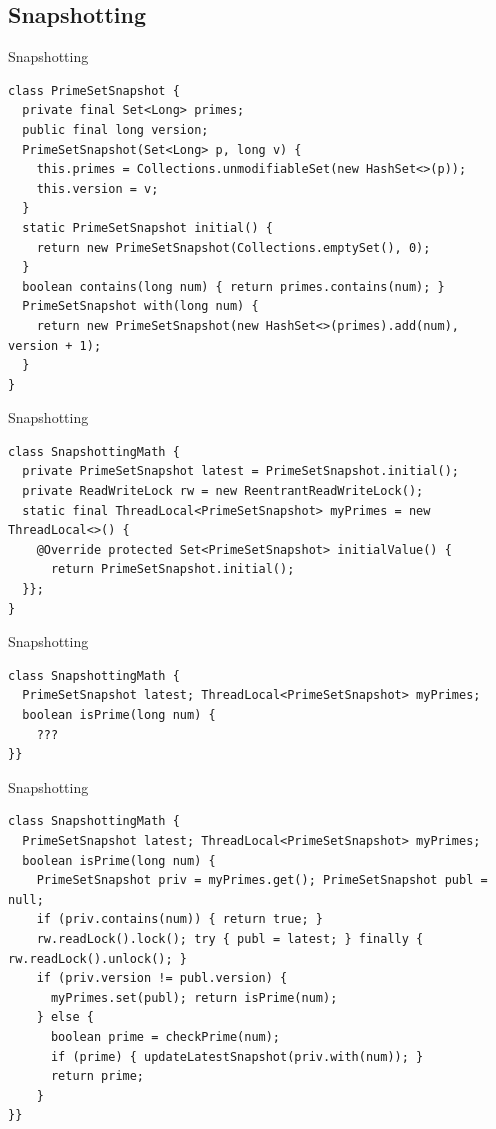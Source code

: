 
\subsection{Snapshotting}
\showTOCSub

\begin{frame}[t,fragile]{Snapshotting}
\begin{verbatim}
class PrimeSetSnapshot {
  private final Set<Long> primes;
  public final long version;
  PrimeSetSnapshot(Set<Long> p, long v) {
    this.primes = Collections.unmodifiableSet(new HashSet<>(p));
    this.version = v;
  }
  static PrimeSetSnapshot initial() {
    return new PrimeSetSnapshot(Collections.emptySet(), 0);
  }
  boolean contains(long num) { return primes.contains(num); }  
  PrimeSetSnapshot with(long num) {
    return new PrimeSetSnapshot(new HashSet<>(primes).add(num), version + 1);
  }
}
\end{verbatim}
\end{frame}

\begin{frame}[t,fragile]{Snapshotting}
\begin{verbatim}
class SnapshottingMath {
  private PrimeSetSnapshot latest = PrimeSetSnapshot.initial();
  private ReadWriteLock rw = new ReentrantReadWriteLock();  
  static final ThreadLocal<PrimeSetSnapshot> myPrimes = new ThreadLocal<>() {
    @Override protected Set<PrimeSetSnapshot> initialValue() {
      return PrimeSetSnapshot.initial();
  }};
}
\end{verbatim}

\end{frame}

\begin{frame}{Snapshotting}
\begin{verbatim}
class SnapshottingMath {
  PrimeSetSnapshot latest; ThreadLocal<PrimeSetSnapshot> myPrimes;
  boolean isPrime(long num) {
    ???
}}
\end{verbatim}
\end{frame}

\begin{frame}{Snapshotting}
\begin{verbatim}
class SnapshottingMath {
  PrimeSetSnapshot latest; ThreadLocal<PrimeSetSnapshot> myPrimes;
  boolean isPrime(long num) {
    PrimeSetSnapshot priv = myPrimes.get(); PrimeSetSnapshot publ = null;
    if (priv.contains(num)) { return true; }    
    rw.readLock().lock(); try { publ = latest; } finally { rw.readLock().unlock(); }
    if (priv.version != publ.version) { 
      myPrimes.set(publ); return isPrime(num);
    } else {
      boolean prime = checkPrime(num);
      if (prime) { updateLatestSnapshot(priv.with(num)); }
      return prime;
    }
}}
\end{verbatim}
\end{frame}

